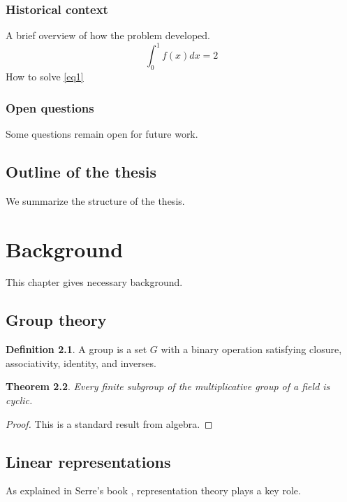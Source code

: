 \documentclass[12pt,reqno]{amsbook}
\newtheorem{theorem}{Theorem}[chapter]
\theoremstyle{definition}
\newtheorem{definition}[theorem]{Definition}
\begin{document}

\subsection{Historical context}
A brief overview of how the problem developed.
\begin{equation}\label{eq1}\int_0^1 f(x) dx = 2\end{equation}
How to solve \eqref{eq1}
\subsection{Open questions}
Some questions remain open for future work.

\section{Outline of the thesis}
We summarize the structure of the thesis.

\chapter{Background}
This chapter gives necessary background.

\section{Group theory}
\begin{definition}
A group is a set $G$ with a binary operation satisfying closure, associativity, identity, and inverses.
\end{definition}

\begin{theorem}
Every finite subgroup of the multiplicative group of a field is cyclic.
\end{theorem}

\begin{proof}
This is a standard result from algebra.
\end{proof}

\section{Linear representations}
As explained in Serre's book \cite{serre}, representation theory plays a key role.
\end{document}
